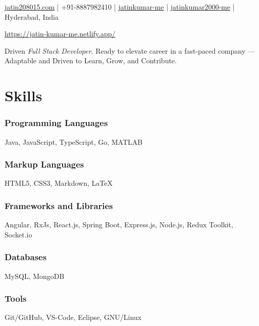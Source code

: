 \documentclass[a4paper]{article}
\author{Jatin Kumar}
\begin{document}
\begin{center}
	\makeatletter
	\centering {\huge \@author}
	\makeatother
	\vspace{6pt}

	\href{mailto:jatin208015\@gmail.com}{{\faAt} jatin208015\@gmail.com} |
	{\faPhone } +91-8887982410 |
	\href{https://github.com/jatinkumar-me}{{\faGithub} jatinkumar-me} |
	\href{https://www.linkedin.com/in/jatinkumar-2000-me/}{{\faLinkedin} {jatinkumar2000-me}} |
	{\faMapMarker} Hyderabad, India

	\href{https://jatin-kumar-me.netlify.app/}{{\faGlobe} https://jatin-kumar-me.netlify.app/}
\end{center}

\vspace{-13pt}
\hrulefill
\vspace{-8pt}

\begin{center}
Driven \textit{Full Stack Developer}. Ready to elevate career in a fast-paced company — Adaptable and Driven to Learn, Grow, and Contribute.
\end{center}

\section{Skills}
\subsubsection*{Programming Languages}
Java, JavaScript, TypeScript, Go, MATLAB
\vspace{-10pt}
\subsubsection*{Markup Languages}
HTML5, CSS3, Markdown, \LaTeX
\vspace{-10pt}
\subsubsection*{Frameworks and Libraries}
Angular, RxJs, React.js, Spring Boot, Express.js, Node.js, Redux Toolkit, Socket.io
\vspace{-10pt}
\subsubsection*{Databases}
MySQL, MongoDB
\vspace{-10pt}
\subsubsection*{Tools}
Git/GitHub, VS-Code, Eclipse, GNU/Linux
\end{document}
